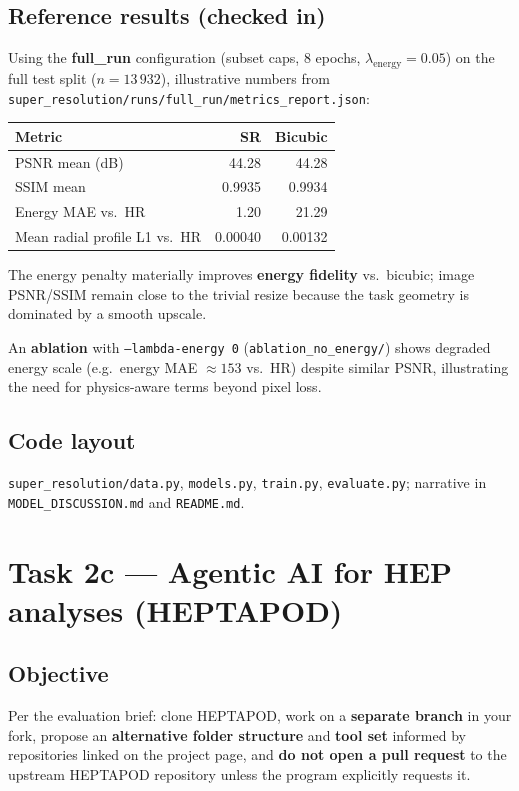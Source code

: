 \documentclass[11pt,a4paper]{article}
\begin{document}
\subsection{Reference results (checked in)}
Using the \textbf{full\_run} configuration (subset caps, 8 epochs, $\lambda_{\mathrm{energy}}=0.05$) on the full test split ($n=13\,932$), illustrative numbers from \texttt{super\_resolution/runs/full\_run/metrics\_report.json}:
\begin{center}
\begin{tabular}{@{}lrr@{}}
\toprule
Metric & SR & Bicubic \\
\midrule
PSNR mean (dB) & 44.28 & 44.28 \\
SSIM mean & 0.9935 & 0.9934 \\
Energy MAE vs.\ HR & 1.20 & 21.29 \\
Mean radial profile L1 vs.\ HR & 0.00040 & 0.00132 \\
\bottomrule
\end{tabular}
\end{center}
The energy penalty materially improves \textbf{energy fidelity} vs.\ bicubic; image PSNR/SSIM remain close to the trivial resize because the task geometry is dominated by a smooth upscale.

An \textbf{ablation} with \texttt{--lambda-energy 0} (\texttt{ablation\_no\_energy/}) shows degraded energy scale (e.g.\ energy MAE $\approx 153$ vs.\ HR) despite similar PSNR, illustrating the need for physics-aware terms beyond pixel loss.

\subsection{Code layout}
\texttt{super\_resolution/data.py}, \texttt{models.py}, \texttt{train.py}, \texttt{evaluate.py}; narrative in \texttt{MODEL\_DISCUSSION.md} and \texttt{README.md}.

\section{Task 2c --- Agentic AI for HEP analyses (HEPTAPOD)}
\label{sec:2c}

\subsection{Objective}
Per the evaluation brief: clone HEPTAPOD, work on a \textbf{separate branch} in your fork, propose an \textbf{alternative folder structure} and \textbf{tool set} informed by repositories linked on the project page, and \textbf{do not open a pull request} to the upstream HEPTAPOD repository unless the program explicitly requests it.
\end{document}
